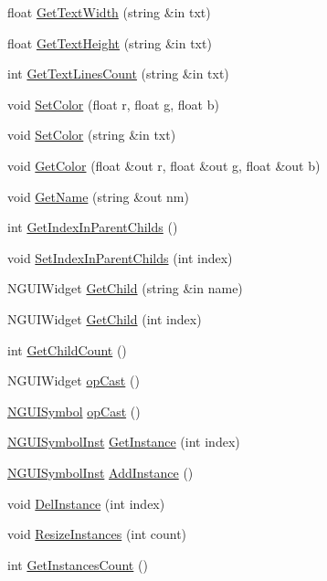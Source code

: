 \begin{DoxyCompactItemize}
\item 
float \hyperlink{class_n_g_u_i_symbol_a5873ca66512357180e487d6013e4b8d0}{Get\+Text\+Width} (string \&in txt)
\item 
float \hyperlink{class_n_g_u_i_symbol_a2cb3dd23d04a59d06ed18c68593a2b88}{Get\+Text\+Height} (string \&in txt)
\item 
int \hyperlink{class_n_g_u_i_symbol_a203a93b20c7b7262dfe03e43b050dd8d}{Get\+Text\+Lines\+Count} (string \&in txt)
\item 
void \hyperlink{class_n_g_u_i_symbol_afb0aab44401a553ec6ee8e4c869b8fa4}{Set\+Color} (float r, float g, float b)
\item 
void \hyperlink{class_n_g_u_i_symbol_a5ad9d6f005111ee5ad2157e71527d760}{Set\+Color} (string \&in txt)
\item 
void \hyperlink{class_n_g_u_i_symbol_a6e14fb615b0351c8295e1c5cbc921151}{Get\+Color} (float \&out r, float \&out g, float \&out b)
\item 
void \hyperlink{class_n_g_u_i_symbol_afbf6a33668eed48bdef1e74aac23d95f}{Get\+Name} (string \&out nm)
\item 
int \hyperlink{class_n_g_u_i_symbol_ab7f67787ab5da2534a59cc057296e972}{Get\+Index\+In\+Parent\+Childs} ()
\item 
void \hyperlink{class_n_g_u_i_symbol_a29c2169202ca88f8c1fcfe45af9374ef}{Set\+Index\+In\+Parent\+Childs} (int index)
\item 
N\+G\+U\+I\+Widget \hyperlink{class_n_g_u_i_symbol_a2055a22ae5a4a431869f93cb959dad8c}{Get\+Child} (string \&in name)
\item 
N\+G\+U\+I\+Widget \hyperlink{class_n_g_u_i_symbol_abde8eb2cc8a46acbde9120ab867e0d0a}{Get\+Child} (int index)
\item 
int \hyperlink{class_n_g_u_i_symbol_a0740a38011c883609a3a1e25a9c114a0}{Get\+Child\+Count} ()
\item 
N\+G\+U\+I\+Widget \hyperlink{class_n_g_u_i_symbol_aef202b531f724f6f4c57a79903b6cc84}{op\+Cast} ()
\item 
\hyperlink{class_n_g_u_i_symbol}{N\+G\+U\+I\+Symbol} \hyperlink{class_n_g_u_i_symbol_a46b6d3d5012610e6b77414901fde2f0c}{op\+Cast} ()
\item 
\hyperlink{class_n_g_u_i_symbol_inst}{N\+G\+U\+I\+Symbol\+Inst} \hyperlink{class_n_g_u_i_symbol_aee167aa5bfd5d81fc5c345570cc757f6}{Get\+Instance} (int index)
\item 
\hyperlink{class_n_g_u_i_symbol_inst}{N\+G\+U\+I\+Symbol\+Inst} \hyperlink{class_n_g_u_i_symbol_acffeab9c4987a13d57133a089d1b8fea}{Add\+Instance} ()
\item 
void \hyperlink{class_n_g_u_i_symbol_ac89e99b7d6f51e9e3aa517f39b39e209}{Del\+Instance} (int index)
\item 
void \hyperlink{class_n_g_u_i_symbol_a964aa4be5cfabdd98cdf43b3ec69bc11}{Resize\+Instances} (int count)
\item 
int \hyperlink{class_n_g_u_i_symbol_a3d87395cd3550e89ed1a6747aea20934}{Get\+Instances\+Count} ()
\end{DoxyCompactItemize}
